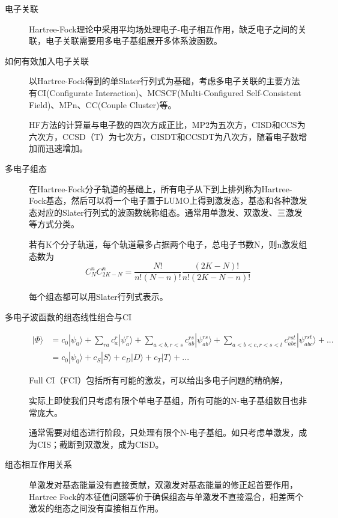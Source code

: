 \documentclass{article}
\numberwithin{equation}{section}
\newcommand{\ket}[1]{| #1 \rangle}
\begin{document}
  \begin{description}
    \item[电子关联] Hartree-Fock理论中采用平均场处理电子-电子相互作用，缺乏电子之间的关联，电子关联需要用多电子基组展开多体系波函数。
  
    \item[如何有效加入电子关联] 以Hartree-Fock得到的单Slater行列式为基础，考虑多电子关联的主要方法有CI(Configurate Interaction)、MCSCF(Multi-Configured Self-Consistent Field)、MPn、CC(Couple Cluster)等。
  
    HF方法的计算量与电子数的四次方成正比，MP2为五次方，CISD和CCS为六次方，CCSD（T）为七次方，CISDT和CCSDT为八次方，随着电子数增加而迅速增加。
  
    \item[多电子组态] 在Hartree-Fock分子轨道的基础上，所有电子从下到上排列称为Hartree-Fock基态，然后可以将一个电子置于LUMO上得到激发态，基态和各种激发态对应的Slater行列式的波函数统称组态。通常用单激发、双激发、三激发等方式分类。
  
    若有K个分子轨道，每个轨道最多占据两个电子，总电子书数N，则n激发组态数为
    \begin{equation}
    C_N^nC_{2K-N}^n=\frac{N!}{n!(N-n)!}\frac{(2K-N)!}{n!(2K-N-n)!}
    \end{equation}
  
    每个组态都可以用Slater行列式表示。
  
  
    \item[多电子波函数的组态线性组合与CI]
    \begin{align*}
    \ket{\Phi} &= c_0\ket{\psi_0} +\sum_{ra}c_a^r\ket{\psi_a^r}+\sum_{a<b,r<s}c_{ab}^{rs}\ket{\psi_{ab}^{rs}}+\sum_{a<b<c,r<s<t}c^{rst}_{abc}\ket{\psi^{rst}_{abc}}+...\\
    &=c_0\ket{\psi_0} + c_S\ket{S}+c_D\ket{D}+c_T\ket{T}+...
    \end{align*}
  
    Full CI（FCI）包括所有可能的激发，可以给出多电子问题的精确解，
  
    实际上即使我们只考虑有限个单电子基组，所有可能的N-电子基组数目也非常庞大。
  
    通常需要对组态进行阶段，只处理有限个N-电子基组。如只考虑单激发，成为CIS；截断到双激发，成为CISD。
  
  
    \item[组态相互作用关系] 单激发对基态能量没有直接贡献，双激发对基态能量的修正起首要作用，Hartree Fock的本征值问题等价于确保组态与单激发不直接混合，相差两个激发的组态之间没有直接相互作用。
  

\end{description}
\end{document}
